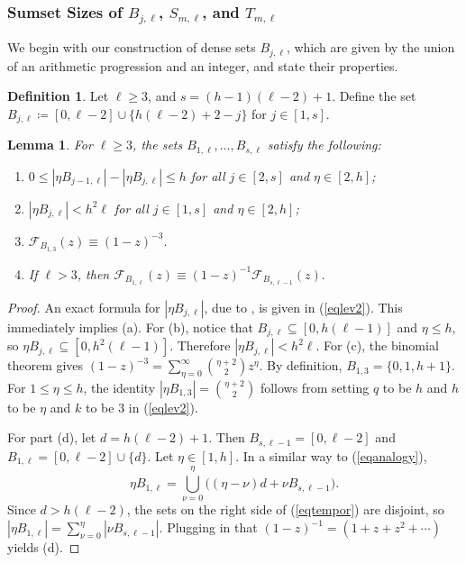 \documentclass{daj}
\newtheorem{lemma}[theorem]{Lemma}
\theoremstyle{definition}
\newtheorem{definition}[theorem]{Definition}
\theoremstyle{remark}
\numberwithin{equation}{section}
\numberwithin{theorem}{section}
\newcommand{\calf}{\mathcal{F}}
\begin{document}
\subsubsection{Sumset Sizes of \texorpdfstring{$B_{j,\ell}$}{Bjl}, \texorpdfstring{$S_{m,\ell}$}{Sml}, and \texorpdfstring{$T_{m,\ell}$}{Tml}}\label{sssection: components}
We begin with our construction of dense sets $B_{j,\ell}$, which are given by the union of an arithmetic progression and an integer, and state their properties. 
\begin{definition}
    Let $\ell \geq 3$, and $s = (h-1)(\ell-2)+1$. Define the set $B_{j,\ell} \coloneq  [0,\ell-2] \cup \{h(\ell-2)+2-j\}$ for $j \in [1,s]$.
\end{definition}
\begin{lemma}\label{lemmadense}
    For $\ell \geq 3$, the sets $B_{1,\ell},\ldots,B_{s,\ell}$ satisfy the following: \begin{enumerate}[label = (\alph*)]
        \item $0 \leq |\eta B_{j-1,\ell}|-|\eta B_{j,\ell}| \leq h$ for all $j \in [2,s]$ and $\eta \in [2,h]$;
        \item $|\eta B_{j,\ell}| < h^2\ell$ for all $j \in [1,s]$ and $\eta \in [2,h]$; 
        \item $\calf_{B_{1,3}}(z) \equiv (1-z)^{-3}.$
        \item If $\ell >3$, then $\calf_{B_{1,\ell}}(z) \equiv (1-z)^{-1}\calf_{B_{s,\ell-1}}(z).$
    \end{enumerate}
\end{lemma}
\begin{proof}
    An exact formula for $|\eta B_{j,\ell}|$, due to \cite{Lev96}, is given in (\ref{eqlev2}). This immediately implies (a). For (b), notice that $B_{j,\ell} \subseteq [0,h(\ell-1)]$ and $\eta \leq h$, so $\eta B_{j,\ell} \subseteq [0,h^2(\ell-1)]$. Therefore $|\eta B_{j,\ell}| < h^2\ell$. For (c), the binomial theorem gives $(1-z)^{-3} = \sum_{\eta = 0}^\infty \binom{\eta+2}{2}z^\eta$. By definition, $B_{1,3} = \{0,1,h+1\}$. For $1 \leq \eta \leq h$, the identity $|\eta B_{1,3}| = \binom{\eta+2}{2}$ follows from setting $q$ to be $h$ and $h$ to be $\eta$ and $k$ to be 3 in (\ref{eqlev2}).  
    
    For part (d), let $d = h(\ell-2)+1$. Then $B_{s,\ell-1} = [0,\ell-2]$ and $B_{1,\ell} = [0,\ell-2] \cup \{d\}$. Let $\eta \in [1,h]$. In a similar way to (\ref{eqanalogy}), \begin{equation}\label{eqtempor}
        \eta B_{1,\ell} = \bigcup_{\nu = 0}^\eta 
        \big((\eta-\nu)d+ \nu B_{s,\ell-1}\big). 
    \end{equation} Since $d > h(\ell-2)$, the sets on the right side of (\ref{eqtempor}) are disjoint, so $|\eta B_{1,\ell}| = \sum_{\nu = 0}^\eta|\nu B_{s,\ell-1}|$. Plugging in that $(1-z)^{-1} = (1+z+z^2+\cdots)$ yields (d).
\end{proof}
\end{document}
